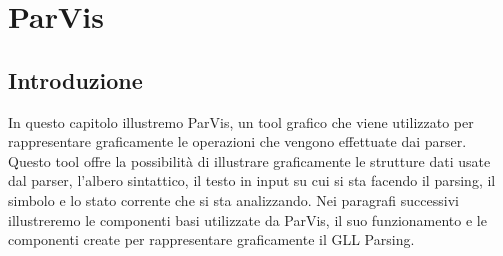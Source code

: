 \chapter{ParVis}
\section{Introduzione}
In questo capitolo illustremo ParVis, un tool grafico che viene utilizzato per rappresentare graficamente le operazioni che vengono effettuate dai parser. Questo tool offre la possibilità di illustrare graficamente le strutture dati usate dal parser, l'albero sintattico, il testo in input su cui si sta facendo il parsing, il simbolo e lo stato corrente che si sta analizzando. Nei paragrafi successivi illustreremo le componenti basi utilizzate da ParVis, il suo funzionamento e le componenti create per rappresentare graficamente il GLL Parsing.
